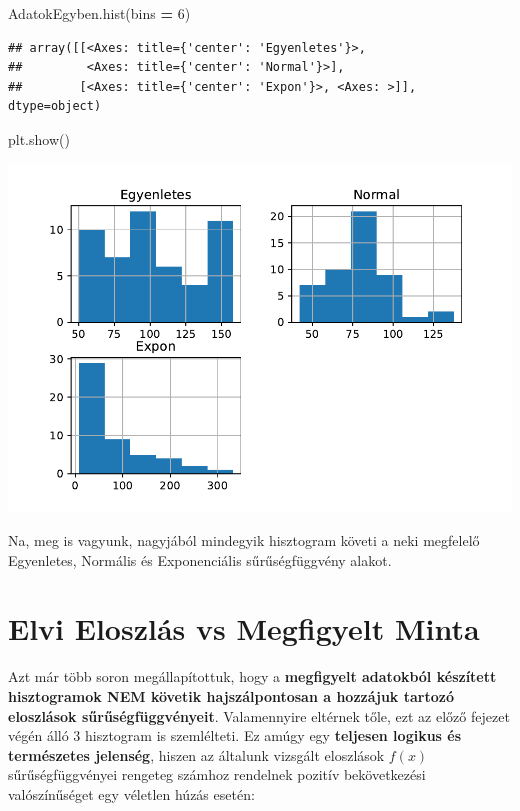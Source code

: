 \documentclass[
]{book}
\newenvironment{Shaded}{\begin{snugshade}}{\end{snugshade}}
\newcommand{\DecValTok}[1]{\textcolor[rgb]{0.00,0.00,0.81}{#1}}
\newcommand{\NormalTok}[1]{#1}
\newcommand{\OperatorTok}[1]{\textcolor[rgb]{0.81,0.36,0.00}{\textbf{#1}}}
\begin{document}
\begin{Shaded}
\begin{Highlighting}[]
\NormalTok{AdatokEgyben.hist(bins }\OperatorTok{=} \DecValTok{6}\NormalTok{)}
\end{Highlighting}
\end{Shaded}

\begin{verbatim}
## array([[<Axes: title={'center': 'Egyenletes'}>,
##         <Axes: title={'center': 'Normal'}>],
##        [<Axes: title={'center': 'Expon'}>, <Axes: >]], dtype=object)
\end{verbatim}

\begin{Shaded}
\begin{Highlighting}[]
\NormalTok{plt.show()}
\end{Highlighting}
\end{Shaded}

\includegraphics{_main_files/figure-latex/unnamed-chunk-212-15.pdf}

Na, meg is vagyunk, nagyjából mindegyik hisztogram követi a neki megfelelő Egyenletes, Normális és Exponenciális sűrűségfüggvény alakot.

\section{Elvi Eloszlás vs Megfigyelt Minta}\label{elvi-eloszluxe1s-vs-megfigyelt-minta}

Azt már több soron megállapítottuk, hogy a \textbf{megfigyelt adatokból készített hisztogramok NEM követik hajszálpontosan a hozzájuk tartozó eloszlások sűrűségfüggvényeit}. Valamennyire eltérnek tőle, ezt az előző fejezet végén álló 3 hisztogram is szemlélteti.
Ez amúgy egy \textbf{teljesen logikus és természetes jelenség}, hiszen az általunk vizsgált eloszlások \(f(x)\) sűrűségfüggvényei rengeteg számhoz rendelnek pozitív bekövetkezési valószínűséget egy véletlen húzás esetén:
\end{document}
